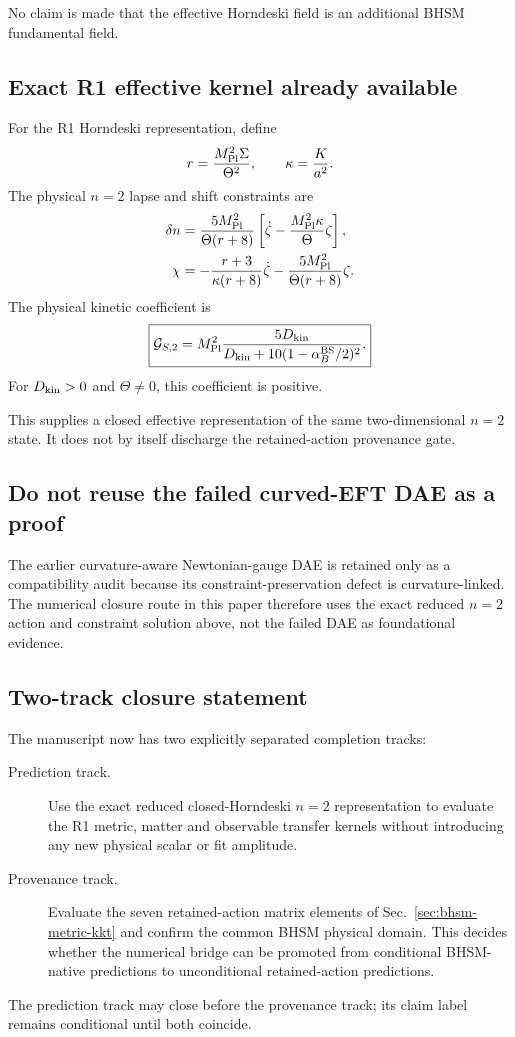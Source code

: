 No claim is made that the effective Horndeski field is an additional BHSM
fundamental field.

\subsection{Exact R1 effective kernel already available}

For the R1 Horndeski representation, define
\begin{equation}
r
=
\frac{M_{\rm Pl}^2\Sigma}{\Theta^2},
\qquad
\kappa=\frac{K}{a^2}.
\end{equation}
The physical $n=2$ lapse and shift constraints are
\begin{align}
\delta n
&=
\frac{5M_{\rm Pl}^2}{\Theta(r+8)}
\left[
\dot\zeta
-
\frac{M_{\rm Pl}^2\kappa}{\Theta}\zeta
\right],
\\
\chi
&=
-\frac{r+3}{\kappa(r+8)}\dot\zeta
-
\frac{5M_{\rm Pl}^2}{\Theta(r+8)}\zeta .
\end{align}
The physical kinetic coefficient is
\begin{equation}
\boxed{
\mathcal G_{S,2}
=
M_{\rm Pl}^2
\frac{5D_{\rm kin}}
{D_{\rm kin}
+
10(1-\alpha_B^{\rm BS}/2)^2}.
}
\label{eq:GS2-representation}
\end{equation}
For $D_{\rm kin}>0$ and $\Theta\ne0$, this coefficient is positive.

This supplies a closed effective representation of the same two-dimensional
$n=2$ state.  It does not by itself discharge the retained-action provenance
gate.

\subsection{Do not reuse the failed curved-EFT DAE as a proof}

The earlier curvature-aware Newtonian-gauge DAE is retained only as a
compatibility audit because its constraint-preservation defect is
curvature-linked.  The numerical closure route in this paper therefore uses
the exact reduced $n=2$ action and constraint solution above, not the failed
DAE as foundational evidence.

\subsection{Two-track closure statement}

The manuscript now has two explicitly separated completion tracks:

\begin{description}
\item[Prediction track.]
Use the exact reduced closed-Horndeski $n=2$ representation to evaluate the
R1 metric, matter and observable transfer kernels without introducing any new
physical scalar or fit amplitude.

\item[Provenance track.]
Evaluate the seven retained-action matrix elements of
Sec.~\ref{sec:bhsm-metric-kkt} and confirm the common BHSM physical domain.
This decides whether the numerical bridge can be promoted from conditional
BHSM-native predictions to unconditional retained-action predictions.
\end{description}

The prediction track may close before the provenance track; its claim label
remains conditional until both coincide.
